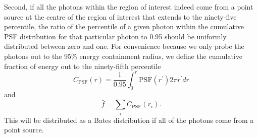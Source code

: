 \documentclass[useAMS,usenatbib]{mn2e}
\begin{document}
Second, if all the photons within the
region of interest indeed come from a point source at the centre of
the region of interest that extends to the ninety-five percentile, the
ratio of the percentile of a given photon within the cumulative PSF
distribution for that particular photon to 0.95 should be uniformly
distributed between zero and one.  For convenience because we only
probe the photons out to the 95\% energy containment radius, we define
the cumulative fraction of energy out to the ninety-fifth percentile
\begin{equation}
  C_\mathrm{PSF} (r) = \frac{1}{0.95} \int_0^r \mathrm{PSF}(r^\prime) 2 \pi r^\prime d r
  \label{eq:2}
\end{equation}
and 
\begin{equation}
  \bar f = \sum_i C_\mathrm{PSF} (r_i).
  \label{eq:3}
\end{equation}
This will be distributed as a Bates distribution if all of the photons
come from a point source.
\end{document}
